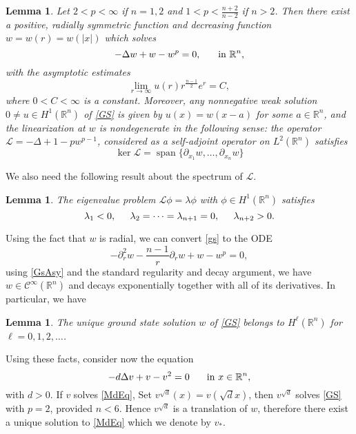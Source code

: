 \documentclass[letterpaper,11pt]{article}
\newcommand{\R}{\mathbb{R}}
\newcommand{\cL}{\mathcal{L}}
\newcommand{\spa}{\operatorname{span}}
\numberwithin{equation}{section}
\theoremstyle{plain}
\newtheorem{lemma}[theorem]{Lemma}
\theoremstyle{remark}
\begin{document}
\begin{lemma}\label{GS}
Let $2<p<\infty$ if $n=1,2$ and $1<p<\frac{n+2}{n-2}$ if $n>2$. Then there exist a positive, radially symmetric function and decreasing function $w=w(r)=w(|x|)$ which solves
\begin{equation}\label{gs}
-\Delta w +w-w^p =0, \hspace{0.2in}\text{ in }\R^n, 
\end{equation}
with the asymptotic estimates
\begin{equation}\label{GsAsy}
\lim_{r\to \infty} u(r)r^{\frac{n-1}{2}}e^r = C,
\end{equation}
where $0<C<\infty$ is a constant.
 Moreover, any nonnegative weak solution $0\neq u \in H^1(\R^n)$ of \eqref{GS} is given by $u(x) = w(x-a)$ for some $a \in \R^n$, and the linearization at $w$ is nondegenerate in the following sense: the operator $\cL = -\Delta+1 - pw^{p-1} $, considered as a self-adjoint operator on $L^2(\R^n)$ satisfies
 \[
 \ker \cL =\spa \{ \partial_{x_1}w,\ldots,\partial_{x_n}w \}
 \]
\end{lemma}
We also need the following result about the spectrum of $\cL$.
\begin{lemma}\label{spec}
The eigenvalue problem $\cL\phi = \lambda \phi$ with $\phi \in H^1(\R^n)$ satisfies 
\[
\lambda_1<0, \hspace{0.2in}\lambda_2 =\cdots=\lambda_{n+1} =0, \hspace{0.2in} \lambda_{n+2}>0.
\]
\end{lemma}
Using the fact that $w$ is radial, we can convert \eqref{gs} to the ODE
\[
-\partial_r^2 w - \frac{n-1}{r} \partial_r w +w - w^p = 0,
\]
using \ref{GsAsy} and the standard regularity and decay argument, we have $w \in \mathscr{C}^\infty(\R^n)$ and decays exponentially together with all of its derivatives. In particular, we have
\begin{lemma}
 The unique ground state solution $w$ of \eqref{GS} belongs to $ H^\ell(\R^n)$ for $\ell=0,1,2,\ldots$.
\end{lemma}

Using these facts, consider now the equation
\begin{equation}
-d\Delta v + v- v^2 = 0 \hspace{0.2in}\text{ in }x \in \R^n, \label{MdEq}
\end{equation}
with $d>0$. If $v$ solves \eqref{MdEq}, Set $v^{\sqrt{d}}(x) = v(\sqrt{d} x)$, then $v^{\sqrt{d}}$ solves \eqref{GS} with $p=2$, provided $n<6$. Hence $v^{\sqrt{d}}$ is a translation of $w$, therefore there exist a unique solution to \eqref{MdEq} which we denote by $v_*$.
\end{document}
